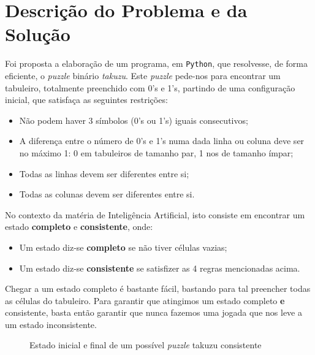 \documentclass[12pt,a4paper]{article}
\begin{document}
\section*{Descrição do Problema e da Solução}

Foi proposta a elaboração de um programa, em \texttt{Python}, que resolvesse, de
forma eficiente, o \textit{puzzle} binário \textit{takuzu}.
Este \textit{puzzle} pede-nos para encontrar um tabuleiro, totalmente preenchido
com 0's e 1's, partindo de uma configuração inicial, que satisfaça as seguintes restrições:
\begin{itemize}
      \item Não podem haver 3 símbolos (0's ou 1's) iguais consecutivos;
      \item A diferença entre o número de 0's e 1's numa dada linha ou coluna deve
            ser no máximo 1: 0 em tabuleiros de tamanho par, 1 nos de tamanho ímpar;
      \item Todas as linhas devem ser diferentes entre si;
      \item Todas as colunas devem ser diferentes entre si.
\end{itemize}

No contexto da matéria de Inteligência Artificial, isto consiste em encontrar um
estado \textbf{completo} e \textbf{consistente}, onde:
\begin{itemize}
      \item Um estado diz-se \textbf{completo} se não tiver células vazias;
      \item Um estado diz-se \textbf{consistente} se satisfizer as 4 regras mencionadas acima.
\end{itemize}

Chegar a um estado completo é bastante fácil, bastando para tal preencher todas as células do tabuleiro.
Para garantir que atingimos um estado completo \textbf{e} consistente, basta então
garantir que nunca fazemos uma jogada que nos leve a um estado inconsistente.


\begin{figure}[H]
      \centering
      
      \hspace*{1cm}
      
      \caption{Estado inicial e final de um possível \textit{puzzle} takuzu consistente}
      \label{fig:takuzu-initial-state}
\end{figure}
\end{document}
